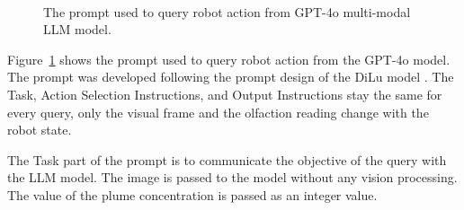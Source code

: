 \begin{figure}[h!] %
\ \\
\vspace*{-.18in}
\begin{center}
\end{center}
\vspace{-.1in}

\caption
{The prompt used to query robot action from GPT-4o multi-modal LLM model.}
\label{fig:LLMPrompt}
\end{figure}

Figure~\ref{fig:LLMPrompt} shows the prompt used to query robot action from the GPT-4o model. The prompt was developed following the prompt design of the DiLu model \cite{wen2023dilu}. The Task, Action Selection Instructions, and Output Instructions stay the same for every query, only the visual frame and the olfaction reading change with the robot state.

The Task part of the prompt is to communicate the objective of the query with the LLM model. The image is passed to the model without any vision processing. The value of the plume concentration is passed as an integer value.

